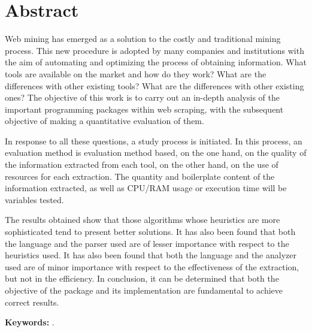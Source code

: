 \chapter*{Abstract}
\label{cha:abstract}


Web mining has emerged as a solution to the costly and traditional mining process. This new procedure is 
adopted by many companies and institutions with the aim of automating and optimizing the process of obtaining 
information. What tools are available on the market and how do they work? What are the differences with 
other existing tools? What are the differences with other existing ones? The objective of this work is to 
carry out an in-depth analysis of the important programming packages within web scraping, with the 
subsequent objective of making a quantitative evaluation of them.

In response to all these questions, a study process is initiated. In this process, an evaluation method is
evaluation method based, on the one hand, on the quality of the information extracted from each tool,
on the other hand, on the use of resources for each extraction. The quantity and boilerplate content of 
the information extracted, as well as CPU/RAM usage or execution time will be variables tested.

The results obtained show that those algorithms whose heuristics are more sophisticated tend to present 
better solutions. It has also been found that both the language and the parser used are of lesser importance 
with respect to the heuristics used. It has also been found that both the language and the analyzer used 
are of minor importance with respect to the effectiveness of the extraction, but not in the efficiency. In 
conclusion, it can be determined that both the objective of the package and its implementation are 
fundamental to achieve correct results.

\textbf{Keywords:} \mybookkeywords.